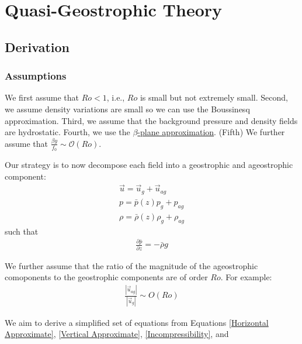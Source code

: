 \section{Quasi-Geostrophic Theory}\label{QG}



\subsection{Derivation}

\subsubsection{Assumptions}

We first assume that $Ro<1$, i.e., $Ro$ is small but not extremely small. Second, we assume density variations are small so we can use the Boussinesq approximation. Third, we assume that the background pressure and density fields are hydrostatic. Fourth, we use the \hyperref[beta plane box]{$\beta$-plane approximation}. (Fifth) We further assume that $\frac{\beta y}{f_0}\sim \mathcal{O}(Ro)$.

Our strategy is to now decompose each field into a geostrophic and ageostrophic component:
\begin{align*}
    \vec{u} = \vec{u}_g + \vec{u}_{ag}
    \\
    p = \bar{p}(z) p_g + p_{ag}
    \\
    \rho = \bar{\rho}(z) \rho_g + \rho_{ag}
\end{align*}
such that
\begin{align*}
    \frac{\partial \bar{p}}{\partial z} = -\bar{\rho}g
\end{align*}

We further assume that the ratio of the magnitude of the ageostrophic comoponents to the geostrophic components are of order $Ro$. For example:
\begin{align*}
    \frac{\left|\vec{u}_{ag}\right|}{\left|\vec{u}_g\right|}\sim O (Ro)
\end{align*}

We aim to derive a simplified set of equations from Equations \ref{Horizontal Approximate}, \ref{Vertical Approximate}, \ref{Incompressibility}, and 

